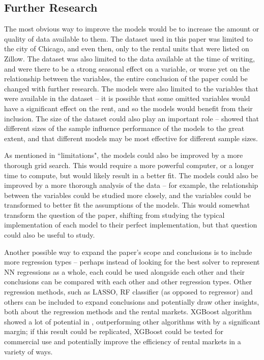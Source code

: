 \documentclass[12pt]{report}
\begin{document}
\subsection{Further Research}
The most obvious way to improve the models would be to increase the amount or quality of data available to them. The dataset used in this paper was limited to the city of Chicago, and even then, only to the rental units that were listed on Zillow. The dataset was also limited to the data available at the time of writing, and were there to be a strong seasonal effect on a variable, or worse yet on the relationship between the variables, the entire conclusion of the paper could be changed with further research. The models were also limited to the variables that were available in the dataset -- it is possible that some omitted variables would have a significant effect on the rent, and so the models would benefit from their inclusion. The size of the dataset could also play an important role -- \textcite{yoshida2022} showed that different sizes of the sample influence performance of the models to the great extent, and that different models may be most effective for different sample sizes. 

As mentioned in ``limitations", the models could also be improved by a more thorough grid search. This would require a more powerful computer, or a longer time to compute, but would likely result in a better fit. The models could also be improved by a more thorough analysis of the data -- for example, the relationship between the variables could be studied more closely, and the variables could be transformed to better fit the assumptions of the models. This would somewhat transform the question of the paper, shifting from studying the typical implementation of each model to their perfect implementation, but that question could also be useful to study.

Another possible way to expand the paper's scope and conclusions is to include more regression types -- perhaps instead of looking for the best solver to represent NN regressions as a whole, each could be used alongside each other and their conclusions can be compared with each other and other regression types. Other regression methods, such as LASSO, RF classifier (as opposed to regressor) and others can be included to expand conclusions and potentially draw other insights, both about the regression methods and the rental markets. XGBoost algorithm showed a lot of potential in \textcite{yoshida2022}, outperforming other algorithms with by a significant margin; if this result could be replicated, XGBoost could be tested for commercial use and potentially improve the efficiency of rental markets in a variety of ways.
\end{document}
